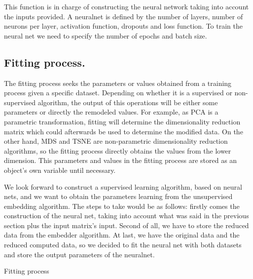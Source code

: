 \documentclass[a4paper,11pt,spanish]{report}
\makeatletter
\def\BState{\State\hskip-\ALG@thistlm}
\makeatother
\begin{document}
This function is in charge of constructing the neural network taking into account the inputs provided. A neuralnet is defined by the number of layers, number of neurons per layer, activation function, dropouts and loss function. To train the neural net we need to specify the number of epochs and batch size.

\subsection{Fitting process.}
\label{ssec:fit}

The fitting process seeks the parameters or values obtained from a training process given a specific dataset. Depending on whether it is a supervised or non-supervised algorithm, the output of this operations will be either some parameters or directly the remodeled values. For example, as PCA is a parametric transformation, fitting will determine the dimensionality reduction matrix which could afterwards be used to determine the modified data. On the other hand, MDS and TSNE are non-parametric dimensionality reduction algorithms, so the fitting process directly obtains the values from the lower dimension. This parameters and values in the fitting process are stored as an object's own variable until necessary.

We look forward to construct a supervised learning algorithm, based on neural nets, and we want to obtain the parameters learning from the unsupervised embedding algorithm. The steps to take would be as follows: firstly comes the construction of the neural net, taking into account what was said in the previous section plus the input matrix's input. Second of all, we have to store the reduced data from the embedder algorithm. At last, we have the original data and the reduced computed data, so we decided to fit the neural net with both datasets and store the output parameters of the neuralnet.
\vspace{10pt}

\begin{algorithm}
\caption{Fitting process}
\end{algorithm}
\end{document}
